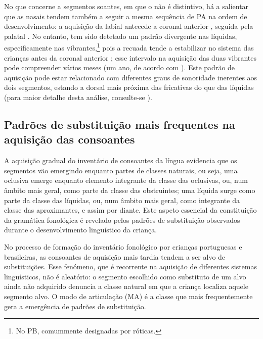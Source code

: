 \documentclass[output=paper]{LSP/langsci}
\begin{document}
No que concerne a segmentos soantes, em que o  não é distintivo, há a salientar que as nasais tendem também a seguir a mesma sequência de PA na ordem de desenvolvimento: a aquisição da labial  antecede a coronal anterior , seguida pela palatal \textipa{/\textltailn/}. No entanto, tem sido detetado um padrão divergente nas líquidas, especificamente nas vibrantes,\footnote{No PB, comummente designadas por róticas.} pois a recuada  tende a estabilizar no sistema das crianças antes da coronal anterior  \citep{costa2010,miranda2007}; esse intervalo na aquisição das duas vibrantes pode compreender vários meses (um ano, de acordo com \citealt{mendes_etal2009,mendes_etal2013}). Este padrão de aquisição pode estar relacionado com diferentes graus de sonoridade inerentes aos dois segmentos, estando a dorsal mais próxima das fricativas do que das líquidas (para maior detalhe desta análise, consulte-se \citealt{miranda2007}).

\subsection{Padrões de substituição mais frequentes na aquisição das consoantes}
\label{subsec:matzenauer_subs_consoantes}

A aquisição gradual do inventário de consoantes da língua evidencia que os segmentos vão emergindo enquanto partes de classes naturais, ou seja, uma oclusiva emerge enquanto elemento integrante da classe das oclusivas, ou, num âmbito mais geral, como parte da classe das obstruintes; uma líquida surge como parte da classe das líquidas, ou, num âmbito mais geral, como integrante da classe das aproximantes, e assim por diante. Este aspeto essencial da constituição da gramática fonológica é revelado pelos padrões de substituição observados durante o desenvolvimento linguístico da criança.

No processo de formação do inventário fonológico por crianças portuguesas e brasileiras, as consoantes de aquisição mais tardia tendem a ser alvo de substituições. Esse fenómeno, que é recorrente na aquisição de diferentes sistemas linguísticos, não é aleatório: o segmento escolhido como substituto de um alvo ainda não adquirido denuncia a classe natural em que a criança localiza aquele segmento alvo. O modo de articulação (MA) é a classe que mais frequentemente gera a emergência de padrões de substituição. 
\end{document}
